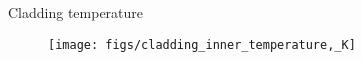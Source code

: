 \begin{frame}{Cladding temperature}

    \scriptsize

    \begin{figure}[h]
        \texttt{[image: figs/cladding\_inner\_temperature,\_K]}
    \end{figure}

\end{frame}